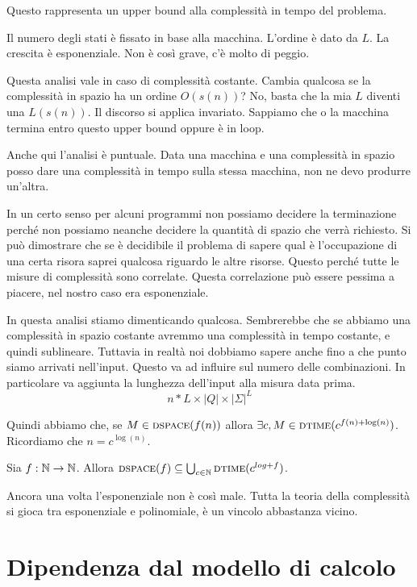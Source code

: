 Questo rappresenta un upper bound alla complessità in tempo del problema.

Il numero degli stati è fissato in base alla macchina. L'ordine è dato da $L$. La crescita è
esponenziale. Non è così grave, c'è molto di peggio.

Questa analisi vale in caso di complessità costante. Cambia qualcosa se la complessità in spazio
ha un ordine $O(s(n))$? No, basta che la mia $L$ diventi una $L(s(n))$. Il discorso si applica
invariato. Sappiamo che o la macchina termina entro questo upper bound oppure è in loop.

Anche qui l'analisi è puntuale. Data una macchina e una complessità in spazio posso dare una
complessità in tempo sulla stessa macchina, non ne devo produrre un'altra.

In un certo senso per alcuni programmi non possiamo decidere la terminazione perché non possiamo
neanche decidere la quantità di spazio che verrà richiesto. Si può dimostrare che se è
decidibile il problema di sapere qual è l'occupazione di una certa risora saprei qualcosa riguardo
le altre risorse. Questo perché tutte le misure di complessità sono correlate. Questa correlazione
può essere pessima a piacere, nel nostro caso era esponenziale.

In questa analisi stiamo dimenticando qualcosa. Sembrerebbe che se abbiamo una complessità in
spazio costante avremmo una complessità in tempo costante, e quindi sublineare. Tuttavia in realtà
noi dobbiamo sapere anche fino a che punto siamo arrivati nell'input. Questo va ad influire sul
numero delle combinazioni. In particolare va aggiunta la lunghezza dell'input alla misura data
prima.
\begin{equation*}
    n*L \times |Q| \times |\Sigma|^{L}
\end{equation*}

Quindi abbiamo che, se $M \in \textsc{dspace}(f(n))$ allora $\exists c, M \in \textsc{dtime}(c^{f(n) + \log(n)})$.
Ricordiamo che $n = c^{\log(n)}$.

\begin{thm}
    Sia $f: \mathbb{N} \to \mathbb{N}$. Allora $\textsc{dspace}(f) \subseteq \bigcup_{c \in \mathbb{N}}\textsc{dtime}(c^{log + f})$.
\end{thm}

Ancora una volta l'esponenziale non è così male. Tutta la teoria della complessità si gioca tra
esponenziale e polinomiale, è un vincolo abbastanza vicino.

\section{Dipendenza dal modello di calcolo}

